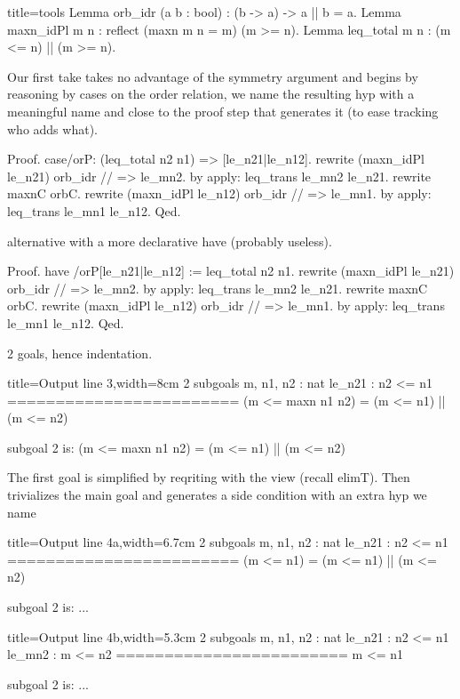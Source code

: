 \begin{coq}{}{title=tools}
Lemma orb_idr (a b : bool) : (b -> a) -> a || b = a.
Lemma maxn_idPl {m n} : reflect (maxn m n = m) (m >= n).
Lemma leq_total m n : (m <= n) || (m >= n).
\end{coq}

Our first take takes no advantage of the symmetry argument and
begins by reasoning by cases on the order relation,
we name the resulting hyp with a meaningful name and close to
the proof step that generates it (to ease tracking who adds what).

\begin{coq}{}{}
Proof.
case/orP: (leq_total n2 n1) => [le_n21|le_n12].
  rewrite (maxn_idPl le_n21) orb_idr // => le_mn2.
  by apply: leq_trans le_mn2 le_n21.
rewrite maxnC orbC.
rewrite (maxn_idPl le_n12) orb_idr // => le_mn1.
by apply: leq_trans le_mn1 le_n12.
Qed.
\end{coq}

alternative with a more declarative have (probably useless).

\begin{coq}{}{}
Proof.
have /orP[le_n21|le_n12] := leq_total n2 n1.
  rewrite (maxn_idPl le_n21) orb_idr // => le_mn2.
  by apply: leq_trans le_mn2 le_n21.
rewrite maxnC orbC.
rewrite (maxn_idPl le_n12) orb_idr // => le_mn1.
by apply: leq_trans le_mn1 le_n12.
Qed.
\end{coq}


2 goals, hence indentation.

\begin{coqout}{}{title=Output line 3,width=8cm}
2 subgoals
m, n1, n2 : nat
le_n21 : n2 <= n1
========================
(m <= maxn n1 n2) = (m <= n1) || (m <= n2)

subgoal 2 is:
(m <= maxn n1 n2) = (m <= n1) || (m <= n2)
\end{coqout}

The first goal is simplified by
reqriting with the  view (recall elimT).  Then
 trivializes the main goal and generates a side condition
with an extra hyp we name 

\begin{coqout}{}{title=Output line 4a,width=6.7cm}
2 subgoals
m, n1, n2 : nat
le_n21 : n2 <= n1
========================
(m <= n1) = (m <= n1) || (m <= n2)

subgoal 2 is: ...
\end{coqout}
\begin{coqout}{}{title=Output line 4b,width=5.3cm}
2 subgoals
m, n1, n2 : nat
le_n21 : n2 <= n1
le_mn2 : m <= n2
========================
m <= n1

subgoal 2 is: ...
\end{coqout}

